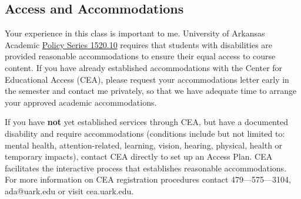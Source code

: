 \documentclass[12pt]{article}
\begin{document}
\subsection*{Access and Accommodations}

Your experience in this class is important to me. University of Arkansas Academic \href{https://policies.uark.edu/academic/152010.php}{Policy Series 1520.10} requires that students with disabilities are provided reasonable accommodations to ensure their equal access to course content. If you have already established accommodations with the Center for Educational Access (CEA), please request your accommodations letter early in the semester and contact me privately, so that we have adequate time to arrange your approved academic accommodations.

If you have \textbf{not} yet established services through CEA, but have a documented disability and require accommodations (conditions include but not limited to: mental health, attention-related, learning, vision, hearing, physical, health  or temporary impacts), contact CEA directly to set up an Access Plan. CEA facilitates the interactive process that establishes reasonable accommodations.  For more information on CEA registration procedures contact 479—575—3104, ada@uark.edu or visit cea.uark.edu.

\end{document}
